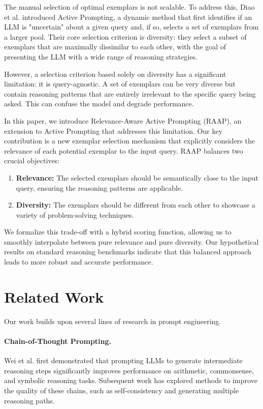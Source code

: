 \documentclass[10pt,twocolumn,letterpaper]{article}
\begin{document}
The manual selection of optimal exemplars is not scalable. To address this, Diao et al. \cite{diao2023active} introduced Active Prompting, a dynamic method that first identifies if an LLM is "uncertain" about a given query and, if so, selects a set of exemplars from a larger pool. Their core selection criterion is diversity: they select a subset of exemplars that are maximally dissimilar to each other, with the goal of presenting the LLM with a wide range of reasoning strategies.

However, a selection criterion based solely on diversity has a significant limitation: it is query-agnostic. A set of exemplars can be very diverse but contain reasoning patterns that are entirely irrelevant to the specific query being asked. This can confuse the model and degrade performance.

In this paper, we introduce Relevance-Aware Active Prompting (RAAP), an extension to Active Prompting that addresses this limitation. Our key contribution is a new exemplar selection mechanism that explicitly considers the relevance of each potential exemplar to the input query. RAAP balances two crucial objectives:
\begin{enumerate}
    \item \textbf{Relevance:} The selected exemplars should be semantically close to the input query, ensuring the reasoning patterns are applicable.
    \item \textbf{Diversity:} The exemplars should be different from each other to showcase a variety of problem-solving techniques.
\end{enumerate}

We formalize this trade-off with a hybrid scoring function, allowing us to smoothly interpolate between pure relevance and pure diversity. Our hypothetical results on standard reasoning benchmarks indicate that this balanced approach leads to more robust and accurate performance.

\section{Related Work}

Our work builds upon several lines of research in prompt engineering.

\paragraph{Chain-of-Thought Prompting.} Wei et al. \cite{wei2022chain} first demonstrated that prompting LLMs to generate intermediate reasoning steps significantly improves performance on arithmetic, commonsense, and symbolic reasoning tasks. Subsequent work has explored methods to improve the quality of these chains, such as self-consistency \cite{wang2022self} and generating multiple reasoning paths.
\end{document}
